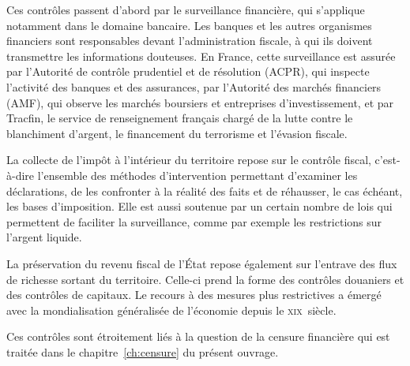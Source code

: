 \documentclass[a4paper,notitlepage]{article}
\begin{document}
Ces contrôles passent d'abord par le surveillance financière, qui s'applique notamment dans le domaine bancaire. Les banques et les autres organismes financiers sont responsables devant l'administration fiscale, à qui ils doivent transmettre les informations douteuses. En France, cette surveillance est assurée par l'Autorité de contrôle prudentiel et de résolution (ACPR), qui inspecte l'activité des banques et des assurances, par l'Autorité des marchés financiers (AMF), qui observe les marchés boursiers et entreprises d'investissement, et par Tracfin, le service de renseignement français chargé de la lutte contre le blanchiment d'argent, le financement du terrorisme et l'évasion fiscale.

La collecte de l'impôt à l'intérieur du territoire repose sur le contrôle fiscal, c'est-à-dire l'ensemble des méthodes d'intervention permettant d'examiner les déclarations, de les confronter à la réalité des faits et de réhausser, le cas échéant, les bases d'imposition. Elle est aussi soutenue par un certain nombre de lois qui permettent de faciliter la surveillance, comme par exemple les restrictions sur l'argent liquide. %

La préservation du revenu fiscal de l'État repose également sur l'entrave des flux de richesse sortant du territoire. Celle-ci prend la forme des contrôles douaniers et des contrôles de capitaux. Le recours à des mesures plus restrictives a émergé avec la mondialisation généralisée de l'économie depuis le \textsc{xix}\ieme{}~siècle. %



Ces contrôles sont étroitement liés à la question de la censure financière qui est traitée dans le chapitre~\ref{ch:censure} du présent ouvrage.
\end{document}
